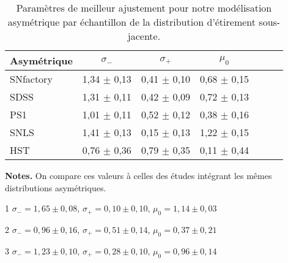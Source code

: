 \documentclass[../main/main.tex]{subfiles}
\begin{document}
\begin{table}
    \centering
    \begin{threeparttable}
        \caption[Paramètres de meilleur ajustement pour notre modélisation
        asymétrique par échantillon de la distribution d'étirement
        sous-jacente.]{Paramètres de meilleur ajustement pour notre modélisation
        asymétrique par échantillon de la distribution d'étirement sous-jacente.}
        \label{tab:bbc}
        \begin{tabular}{lcccccc}
        \toprule
        Asymétrique   & $\sigma_{-}$    & $\sigma_{+}$    & $\mu_0$ \\
        \midrule
        SNfactory     & 1,34 $\pm$ 0,13 & 0,41 $\pm$ 0,10 & 0,68 $\pm$ 0,15 \\
        SDSS\tnote{1} & 1,31 $\pm$ 0,11 & 0,42 $\pm$ 0,09 & 0,72 $\pm$ 0,13 \\
        PS1\tnote{2}  & 1,01 $\pm$ 0,11 & 0,52 $\pm$ 0,12 & 0,38 $\pm$ 0,16 \\
        SNLS\tnote{3} & 1,41 $\pm$ 0,13 & 0,15 $\pm$ 0,13 & 1,22 $\pm$ 0,15 \\
        HST           & 0,76 $\pm$ 0,36 & 0,79 $\pm$ 0,35 & 0,11 $\pm$ 0,44 \\
        \bottomrule
        \end{tabular}
        \begin{tablenotes}[flushleft]
            \item \textbf{\hspace{-3,2pt}Notes.} On compare ces valeurs à celles
                des études intégrant les mêmes distributions asymétriques.
            \item [1] $\sigma_{-} = 1,65 \pm 0,08$, $\sigma_{+} = 0,10 \pm
                0,10$, $\mu_0 = 1,14 \pm 0,03$ \citep[Tableau~1,][]{scolnic2016}
            \item [2] $\sigma_{-} = 0,96 \pm 0,16$, $\sigma_{+} = 0,51 \pm
                0,14$, $\mu_0 = 0,37 \pm 0,21$ \citep[Tableau~3,][]{scolnic2018}
            \item [3] $\sigma_{-} = 1,23 \pm 0,10$, $\sigma_{+} = 0,28 \pm
                0,10$, $\mu_0 = 0,96 \pm 0,14$ \citep[Tableau~1,][]{scolnic2016}
        \end{tablenotes}
    \end{threeparttable}
\end{table}
\end{document}

